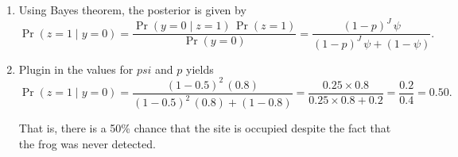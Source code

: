 \documentclass[
  letterpaper,
  DIV=11,
  numbers=noendperiod,
  oneside]{scrartcl}
\begin{document}
\begin{tcolorbox}
\begin{enumerate}
  \[\Pr(y = 0) = \underbrace{(1-p)^{J}\,\psi}_{\text{present but undetected}}
      + \underbrace{(1-\psi)}_{\text{absent}}.
  \]
\item
  Using Bayes theorem, the posterior is given by
  \[\Pr(z = 1 \mid y = 0)= \frac{\Pr(y = 0 \mid z = 1)\,\Pr(z = 1)}{\Pr(y = 0)}= \frac{(1-p)^{J}\,\psi}{(1-p)^{J}\,\psi + (1-\psi)}.\]
\item
  Plugin in the values for \(psi\) and \(p\) yields \[
      \Pr(z = 1 \mid y = 0)
  = \frac{(1-0.5)^{2}\,(0.8)}{(1-0.5)^{2}\,(0.8) + (1-0.8)}
      = \frac{0.25 \times 0.8}{0.25 \times 0.8 + 0.2}
  = \frac{0.2}{0.4} = 0.50.
  \]

  That is, there is a 50\% chance that the site is occupied despite the
  fact that the frog was never detected.
\end{enumerate}

\end{tcolorbox}
\end{document}
